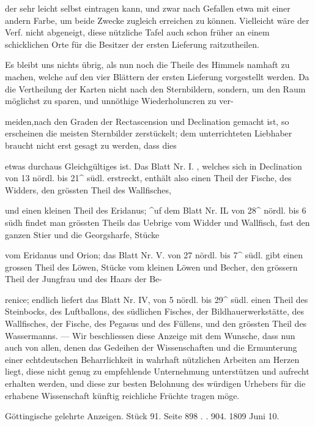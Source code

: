 \documentclass[10pt,a4paper]{article}
\begin{document}
der sehr leicht selbst eintragen kann, und zwar nach Gefallen etwa mit einer andern Farbe, um beide Zwecke zugleich erreichen zu können. Vielleicht wäre der Verf. nicht abgeneigt, diese nützliche Tafel auch schon früher an einem schicklichen Orte für die Besitzer der ersten Lieferung raitzutheilen.

Es bleibt uns nichts übrig, als nun noch die Theile des Himmels namhaft zu machen, welche auf den vier Blättern der ersten Lieferung vorgestellt werden. Da die Vertheilung der Karten nicht nach den Sternbildern, sondern, um den Raum möglichst zu sparen, und unnöthige Wiederholuncren zu ver-

meiden,nach den Graden der Rectascension und Declination gemacht ist, so erscheinen die meisten Sternbilder zerstückelt; dem unterrichteten Liebhaber braucht nicht erst gesagt zu werden, dass dies

etwas durchaus Gleichgültiges ist. Das Blatt Nr. I. , welches sich in Declination von 13\textdegree{} nördl. bis 21\textasciicircum{}\textdegree{} südl. erstreckt, enthält also einen Theil der Fische, des Widders, den grössten Theil des Wallfisches,

und einen kleinen Theil des Eridanus; \textasciicircum{}uf dem Blatt Nr. IL von 28\textasciicircum{}\textdegree{} nördl. bis 6\textdegree{} südh findet man grössten Theils das Uebrige vom Widder und Wallfisch, fast den ganzen Stier und die Georgsharfe, Stücke

vom Eridanus und Orion; das Blatt Nr. V. von 27\textdegree{} nördl. bis 7\textasciicircum{}\textdegree{} südl. gibt einen grossen Theil des Löwen, Stücke vom kleinen Löwen und Becher, den grössern Theil der Jungfrau und des Haars der Be-

renice; endlich liefert das Blatt Nr. IV, von 5\textdegree{} nördl. bis 29\textasciicircum{}\textdegree{} südl. einen Theil des Steinbocks, des Luftballons, des südlichen Fisches, der Bildhauerwerkstätte, des Wallfisches, der Fische, des Pegasus und des Füllens, und den grössten Theil des Wassermanns. — Wir beschliessen diese Anzeige mit dem Wunsche, dass nun auch von allen, denen das Gedeihen der Wissenschaften und die Ermunterung einer echtdeutschen Beharrlichkeit in wahrhaft nützlichen Arbeiten am Herzen liegt, diese nicht genug zu empfehlende Unternehmung unterstützen und aufrecht erhalten werden, und diese zur besten Belohnung des würdigen Urhebers für die erhabene Wissenschaft künftig reichliche Früchte tragen möge.

Göttingische gelehrte Anzeigen. Stück 91. Seite 898 . . 904. 1809 Juni 10.
\end{document}

